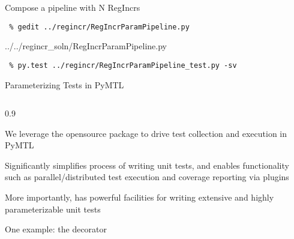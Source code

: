 \begin{task}\begin{frame}[fragile]{Compose a pipeline with N RegIncrs}

\vspace{-0.15in}
\begin{Verbatim}[commandchars=\\\{\}]
 % cd \midtilde/pymtl-tut/build
 % gedit ../regincr/RegIncrParamPipeline.py
\end{Verbatim}
\vspace{-0.17in}

%
{../../regincr_soln/RegIncrParamPipeline.py}

\vspace{-0.2in}
\begin{Verbatim}
 % py.test ../regincr/RegIncrParamPipeline_test.py -sv
\end{Verbatim}

\end{frame}
\end{task}

\begin{frame}{Parameterizing Tests in PyMTL}

\medskip
\begin{cbxcols}
\begin{column}{0.9\tw}
\begin{cbxlist}

  \1 We leverage the opensource  package to drive test
     collection and execution in PyMTL

  \1 Significantly simplifies process of writing unit tests, and enables
     functionality such as parallel/distributed test execution and
     coverage reporting via plugins

  \1 More importantly,  has powerful facilities for writing
     extensive and highly parameterizable unit tests

  \1 One example: the  decorator

\end{cbxlist}
\end{column}
\end{cbxcols}
\end{frame}

